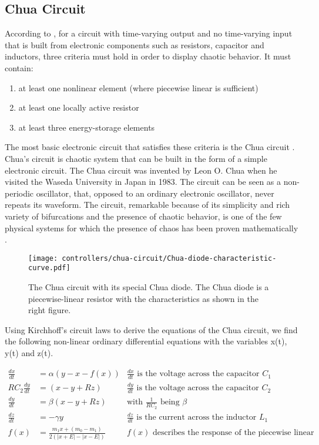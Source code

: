 \documentclass[main]{subfiles}
\begin{document}
\subsection{Chua Circuit}
\label{subsec:chua-circuit}

According to \cite{bib:Kennedy1993}, for a circuit with time-varying output and no time-varying input that is built from electronic components such as resistors, capacitor and inductors, three criteria must hold in order to display chaotic behavior. %
%
It must contain:
\begin{enumerate}
  \item at least one nonlinear element (where piecewise linear is sufficient)
  \item at least one locally active resistor
  \item at least three energy-storage elements
\end{enumerate}
  
The most basic electronic circuit that satisfies these criteria is the Chua circuit \cite{bib:Matsumoto1985}. %
%
Chua's circuit is chaotic system that can be built in the form of a simple electronic circuit. %
%
The Chua circuit was invented by Leon O. Chua when he visited the Waseda University in Japan in 1983. %
%
The circuit can be seen as a non-periodic oscillator, that, opposed to an ordinary electronic oscillator, never repeats its waveform. %
%
The circuit, remarkable because of its simplicity and rich variety of bifurcations and the presence of chaotic behavior, is one of the few physical systems for which the presence of chaos has been proven mathematically \cite{bib:Kennedy1993}.

\begin{figure}[H]
\centering

\texttt{[image: controllers/chua-circuit/Chua-diode-characteristic-curve.pdf]}
\caption[The Chua circuit]{The Chua circuit with its special Chua diode. The Chua diode is a piecewise-linear resistor with the characteristics as shown in the right figure.}
\label{figure:chuacircuit}
\end{figure}

Using Kirchhoff's circuit laws to derive the equations of the Chua circuit, we find the following non-linear ordinary differential equations with the variables x(t), y(t) and z(t).

\begin{align*}
\frac{dx}{dt}&=\alpha (y-x-f(x)) &\frac{dx}{dt}\text{ is the voltage across the capacitor }C_1\\
RC_2\frac{dy}{dt}&= (x-y+Rz) &\frac{dy}{dt}\text{ is the voltage across the capacitor }C_2\\
\frac{dy}{dt}&=\beta (x-y+Rz) &\text{with } \frac{1}{RC_2} \text{ being }\beta\\
\frac{dz}{dt}&=-\gamma y &\frac{dz}{dt}\text{ is the current across the inductor }L_1\\
f (x) &= \frac{m_1 x + (m_0 - m_1)}{2 (| x + E | -| x - E |)} &f(x)\text{ describes the response of the piecewise linear resistor}
\end{align*}
\end{document}
